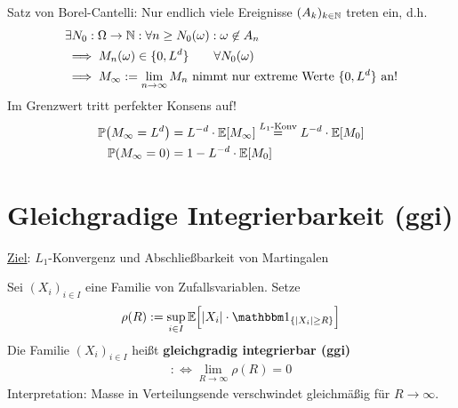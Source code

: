 \begin{beisp}[Wählermodell]
Satz von Borel-Cantelli: Nur endlich viele Ereignisse $(A_k)_{k\in\mathbb{N}}$ treten ein, d.h.
\begin{align*}
&\exists N_0:\Omega\to\mathbb{N}:\forall n\geq N_0(\omega):\omega\not\in A_n\\
&\implies M_n(\omega)\in\lbrace0,L^d\rbrace\qquad\forall N_0(\omega)\\
&\implies M_\infty:=\lim\limits_{n\to\infty} M_n\text{ nimmt nur extreme Werte $\lbrace0,L^d\rbrace$ an!}
\end{align*}
Im Grenzwert tritt perfekter Konsens auf!
\begin{align*}
\mathbb{P}\big(M_\infty=L^d\big)&=L^{-d}\cdot\mathbb{E}[M_\infty]\stackrel{L_1\text{-Konv}}{=} L^{-d}\cdot\mathbb{E}[M_0]\\
\mathbb{P}(M_\infty=0)&=1-L^{-d}\cdot\mathbb{E}[M_0]
\end{align*}
\end{beisp}

\setcounter{section}{1} %
\section{Gleichgradige Integrierbarkeit (ggi)} %
\setcounter{section}{4} %
\ul{Ziel}: $L_1$-Konvergenz und Abschließbarkeit von Martingalen

\begin{defi}
Sei $(X_i)_{i\in I}$ eine Familie von Zufallsvariablen. Setze
\begin{align*}
\rho(R):=\sup\limits_{i\in I}\E\Big[|X_i|\cdot\indi_{\lbrace |X_i|\geq R\rbrace}\Big]
\end{align*}
Die Familie $(X_i)_{i\in I}$ heißt \textbf{gleichgradig integrierbar (ggi)}
\begin{align*}
:\Longleftrightarrow\lim\limits_{R\to\infty}\rho(R)=0
\end{align*}
Interpretation: Masse in Verteilungsende verschwindet gleichmäßig für $R\to\infty$.
\end{defi}

